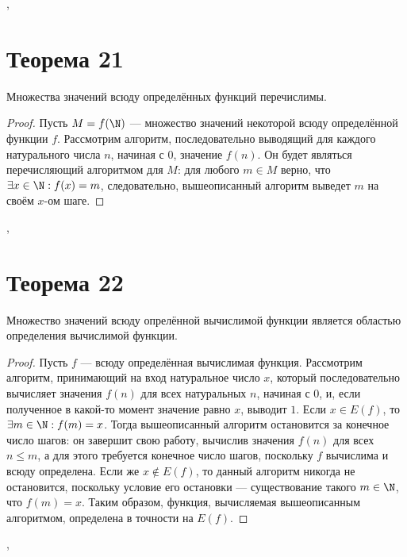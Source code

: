 \documentclass[a4paper,12pt]{article}
\begin{document}
    \sep
    
    \section {Теорема 21}
    \begin{theorem}
    Множества значений всюду определённых функций перечислимы.
    \end{theorem}
    \begin{proof} 
    Пусть $M=f(\N)$ --- множество значений некоторой всюду определённой функции $f$. Рассмотрим алгоритм, последовательно выводящий для каждого натурального числа $n$, начиная с $0$, значение $f(n)$. Он будет являться перечисляющий алгоритмом для $M$: для любого $m\in M$ верно, что $\exists x \in \N : f(x) = m$, следовательно, вышеописанный алгоритм выведет $m$ на своём $x$-ом шаге.
    \end{proof}
	
	\sep
    
    \section {Теорема 22}
    \begin{theorem}
    Множество значений всюду опрелённой вычислимой функции является областью определения вычислимой функции.
    \end{theorem} 
    \begin{proof} Пусть $f$ --- всюду определённая вычислимая функция. Рассмотрим алгоритм, принимающий на вход натуральное число $x$, который последовательно вычисляет значения $f(n)$ для всех натуральных $n$, начиная с $0$, и, если полученное в какой-то момент значение равно $x$, выводит $1$. Если $x\in E(f)$, то $\exists m \in \N : f(m) = x$. Тогда вышеописанный алгоритм остановится за конечное число шагов: он завершит свою работу, вычислив значения $f(n)$ для всех $n\leqslant m$, а для этого требуется конечное число шагов, поскольку $f$ вычислима и всюду определена. Если же $x\not\in E(f)$, то данный алгоритм никогда не остановится, поскольку условие его остановки --- существование такого $m\in\N$, что $f(m)=x$. Таким образом, функция, вычисляемая вышеописанным алгоритмом, определена в точности на $E(f)$.
    \end{proof}
	
	\sep
	
\end{document}
